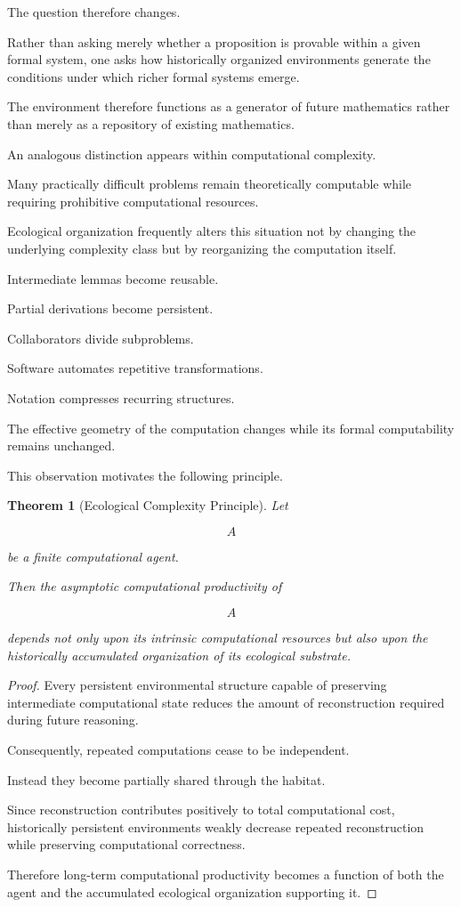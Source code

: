 \documentclass[12pt,oneside]{article}
\newtheorem{theorem}[definition]{Theorem}
\theoremstyle{remark}
\begin{document}
The question therefore changes.

Rather than asking merely whether a proposition is provable within a given
formal system, one asks how historically organized environments generate the
conditions under which richer formal systems emerge.

The environment therefore functions as a generator of future mathematics rather
than merely as a repository of existing mathematics.

An analogous distinction appears within computational complexity.

Many practically difficult problems remain theoretically computable while
requiring prohibitive computational resources.

Ecological organization frequently alters this situation not by changing the
underlying complexity class but by reorganizing the computation itself.

Intermediate lemmas become reusable.

Partial derivations become persistent.

Collaborators divide subproblems.

Software automates repetitive transformations.

Notation compresses recurring structures.

The effective geometry of the computation changes while its formal
computability remains unchanged.

This observation motivates the following principle.

\begin{theorem}[Ecological Complexity Principle]

Let

\[
A
\]

be a finite computational agent.

Then the asymptotic computational productivity of

\[
A
\]

depends not only upon its intrinsic computational resources but also upon the
historically accumulated organization of its ecological substrate.

\end{theorem}

\begin{proof}

Every persistent environmental structure capable of preserving intermediate
computational state reduces the amount of reconstruction required during future
reasoning.

Consequently, repeated computations cease to be independent.

Instead they become partially shared through the habitat.

Since reconstruction contributes positively to total computational cost,
historically persistent environments weakly decrease repeated reconstruction
while preserving computational correctness.

Therefore long-term computational productivity becomes a function of both the
agent and the accumulated ecological organization supporting it.

\end{proof}
\end{document}
